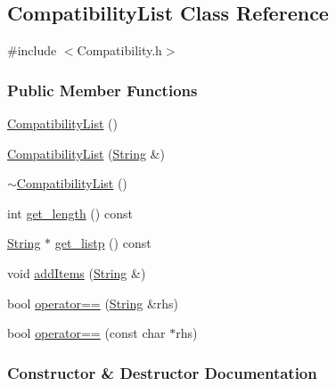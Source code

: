 \hypertarget{class_compatibility_list}{}\subsection{Compatibility\+List Class Reference}
\label{class_compatibility_list}


{\ttfamily \#include $<$Compatibility.\+h$>$}

\subsubsection*{Public Member Functions}
\begin{DoxyCompactItemize}
\item 
\mbox{\hyperlink{class_compatibility_list_a077f7dc792a5419fbd9a0d105133cfbd}{Compatibility\+List}} ()
\item 
\mbox{\hyperlink{class_compatibility_list_af34d724919febac11f933a4d42f3d550}{Compatibility\+List}} (\mbox{\hyperlink{class_string}{String}} \&)
\item 
\mbox{\hyperlink{class_compatibility_list_ac3f2eebda805a5b587c498a4915161fc}{$\sim$\+Compatibility\+List}} ()
\item 
int \mbox{\hyperlink{class_compatibility_list_a44d0f7533b66ced7a957f2846e76c4ec}{get\+\_\+length}} () const
\item 
\mbox{\hyperlink{class_string}{String}} $\ast$ \mbox{\hyperlink{class_compatibility_list_a16642e17369c398c67b04f549f2f77ac}{get\+\_\+listp}} () const
\item 
void \mbox{\hyperlink{class_compatibility_list_a7d9dbeada758ed1fc4849d77058ff69d}{add\+Items}} (\mbox{\hyperlink{class_string}{String}} \&)
\item 
bool \mbox{\hyperlink{class_compatibility_list_a3836f2aaefc1753287dd4d6052e17469}{operator==}} (\mbox{\hyperlink{class_string}{String}} \&rhs)
\item 
bool \mbox{\hyperlink{class_compatibility_list_ad476ceb7026c6316112d5f11b283357e}{operator==}} (const char $\ast$rhs)
\end{DoxyCompactItemize}


\subsubsection{Constructor \& Destructor Documentation}
\mbox{\label{class_compatibility_list_a077f7dc792a5419fbd9a0d105133cfbd}} 
